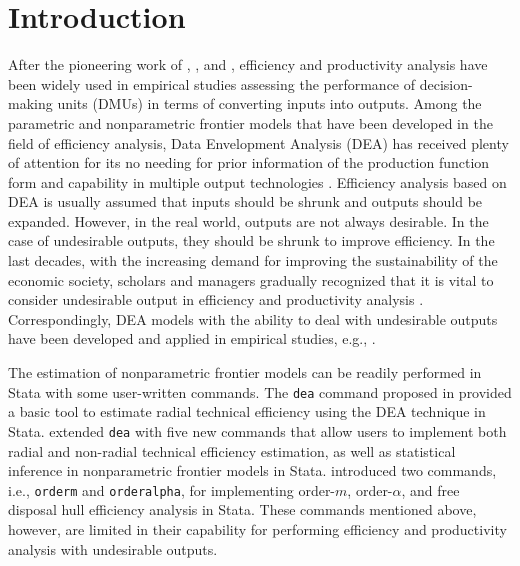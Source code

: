 
\section{Introduction}\label{sec_intro}
After the pioneering work of \cite{Farrell1957}, \cite{Debreu1951}, and \cite{koopmans1951analysis}, efficiency and productivity analysis have been widely used in empirical studies assessing the performance of decision-making units (DMUs) in terms of converting inputs into outputs. 
Among the parametric and nonparametric frontier models that have been developed in the field of efficiency analysis, Data Envelopment Analysis (DEA) has received plenty of attention for its no needing for prior information of the production function form and capability in multiple output technologies \citep{Fare1985,Fare1994}. 
Efficiency analysis based on DEA is usually assumed that inputs should be shrunk and outputs should be expanded. However, in the real
world, outputs are not always desirable. In the case of undesirable outputs, they should be shrunk to improve efficiency.
In the last decades, with the increasing demand for improving the sustainability of the economic society, scholars and managers gradually recognized that it is vital to consider undesirable output in efficiency and productivity analysis \citep{Chung1997,Mahlberg2011}. Correspondingly, DEA models with the ability to deal with undesirable outputs have been developed and applied in empirical studies, e.g., \citep{Zhou2012,Lin2015}. 

The estimation of nonparametric frontier models can be readily performed in Stata with some user-written commands. 
The {\tt dea} command proposed in \cite{Ji2010} provided a basic tool to estimate radial technical efficiency using the DEA technique in Stata. 
\cite{Badunenko2016} extended {\tt dea} with five new commands that allow users to implement both radial and non-radial technical efficiency estimation, as well as statistical inference in nonparametric frontier models in Stata. 
\cite{Tauchmann2012} introduced two commands, i.e., {\tt orderm} and {\tt orderalpha}, for implementing order-$m$, order-$\alpha$, and free disposal hull efficiency analysis in Stata. 
These commands mentioned above, however, are limited in their capability for performing efficiency and productivity analysis with undesirable outputs. 

